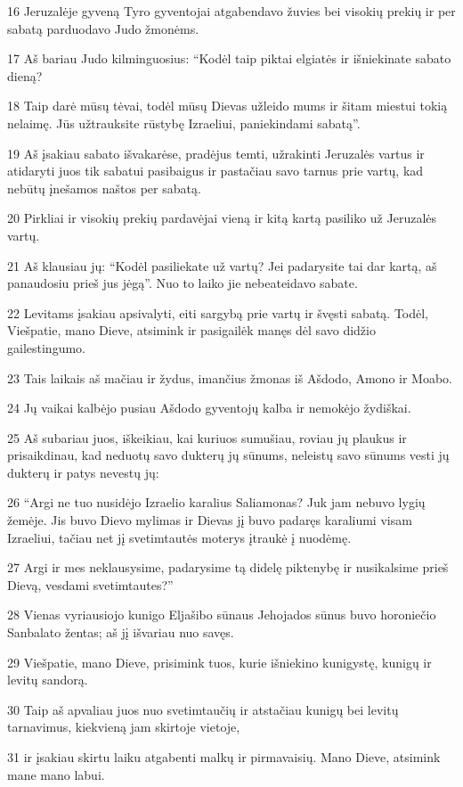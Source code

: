 \par 16 Jeruzalėje gyveną Tyro gyventojai atgabendavo žuvies bei visokių prekių ir per sabatą parduodavo Judo žmonėms. 
\par 17 Aš bariau Judo kilminguosius: “Kodėl taip piktai elgiatės ir išniekinate sabato dieną? 
\par 18 Taip darė mūsų tėvai, todėl mūsų Dievas užleido mums ir šitam miestui tokią nelaimę. Jūs užtrauksite rūstybę Izraeliui, paniekindami sabatą”. 
\par 19 Aš įsakiau sabato išvakarėse, pradėjus temti, užrakinti Jeruzalės vartus ir atidaryti juos tik sabatui pasibaigus ir pastačiau savo tarnus prie vartų, kad nebūtų įnešamos naštos per sabatą. 
\par 20 Pirkliai ir visokių prekių pardavėjai vieną ir kitą kartą pasiliko už Jeruzalės vartų. 
\par 21 Aš klausiau jų: “Kodėl pasiliekate už vartų? Jei padarysite tai dar kartą, aš panaudosiu prieš jus jėgą”. Nuo to laiko jie nebeateidavo sabate. 
\par 22 Levitams įsakiau apsivalyti, eiti sargybą prie vartų ir švęsti sabatą. Todėl, Viešpatie, mano Dieve, atsimink ir pasigailėk manęs dėl savo didžio gailestingumo. 
\par 23 Tais laikais aš mačiau ir žydus, imančius žmonas iš Ašdodo, Amono ir Moabo. 
\par 24 Jų vaikai kalbėjo pusiau Ašdodo gyventojų kalba ir nemokėjo žydiškai. 
\par 25 Aš subariau juos, iškeikiau, kai kuriuos sumušiau, roviau jų plaukus ir prisaikdinau, kad neduotų savo dukterų jų sūnums, neleistų savo sūnums vesti jų dukterų ir patys nevestų jų: 
\par 26 “Argi ne tuo nusidėjo Izraelio karalius Saliamonas? Juk jam nebuvo lygių žemėje. Jis buvo Dievo mylimas ir Dievas jį buvo padaręs karaliumi visam Izraeliui, tačiau net jį svetimtautės moterys įtraukė į nuodėmę. 
\par 27 Argi ir mes neklausysime, padarysime tą didelę piktenybę ir nusikalsime prieš Dievą, vesdami svetimtautes?” 
\par 28 Vienas vyriausiojo kunigo Eljašibo sūnaus Jehojados sūnus buvo horoniečio Sanbalato žentas; aš jį išvariau nuo savęs. 
\par 29 Viešpatie, mano Dieve, prisimink tuos, kurie išniekino kunigystę, kunigų ir levitų sandorą. 
\par 30 Taip aš apvaliau juos nuo svetimtaučių ir atstačiau kunigų bei levitų tarnavimus, kiekvieną jam skirtoje vietoje, 
\par 31 ir įsakiau skirtu laiku atgabenti malkų ir pirmavaisių. Mano Dieve, atsimink mane mano labui.



